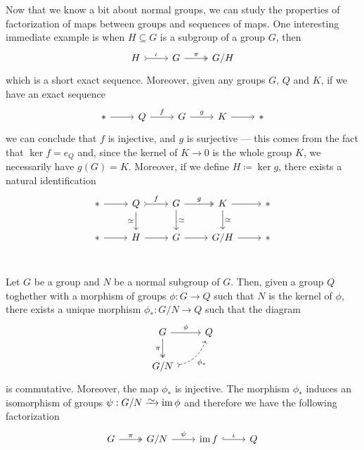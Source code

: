 Now that we know a bit about normal groups, we can study the properties of
factorization of maps between groups and sequences of maps. One interesting
immediate example is when \(H \subseteq G\) is a subgroup of a group \(G\), then
\[
  \begin{tikzcd}
    H \ar[r, tail, "\iota"] &G \ar[r, two heads, "\pi"] &G/H
  \end{tikzcd}
\]
which is a short exact sequence. Moreover, given any groups \(G\), \(Q\) and
\(K\), if we have an exact sequence
\[
  \begin{tikzcd}
    * \ar[r] &Q \ar[r, "f"] &G \ar[r, "g"] &K \ar[r] &*
  \end{tikzcd}
\]
we can conclude that \(f\) is injective, and \(g\) is surjective --- this comes
from the fact that \(\ker f = e_Q\) and, since the kernel of \(K \to 0\) is the
whole group \(K\), we necessarily have \(g(G) = K\). Moreover, if we define \(H
\coloneq \ker g\), there exists a natural identification
\[
  \begin{tikzcd}
    * \ar[r]
    &Q \ar[d, swap, "\iso"] \ar[r, tail, "f"]
    &G \ar[r, two heads, "g"] \ar[d, "\iso"]
    &K \ar[r] \ar[d, "\iso"]
    &* \\
    * \ar[r] &H \ar[r] &G \ar[r] &G/H \ar[r] &* \\
  \end{tikzcd}
\]

\begin{proposition}
\label{prop:universal-property-quotients-grp}
Let \(G\) be a group and \(N\) be a normal subgroup of \(G\). Then, given a
group \(Q\) toghether with a morphism of groups \(\phi: G \to Q\) such that
\(N\) is the kernel of \(\phi\), there exists a unique morphism
\(\phi_{*}: G/N \to Q\) such that the diagram
\[
  \begin{tikzcd}
    G \ar[d, two heads, swap, "\pi"] \ar[r, "\phi"] &Q \\
    G/N \ar[ur, dashed, swap, bend right, tail, "\phi_{*}"] &
  \end{tikzcd}
\]
is commutative. Moreover, the map \(\phi_*\) is injective. The morphism
\(\phi_{*}\) induces an isomorphism of groups \(\psi: G/N \isoto \im \phi\) and
therefore we have the following factorization
\[
  \begin{tikzcd}
    G \ar[r, two heads, "\pi"] &G/N \ar[r, "\psi"]
    &\im f \ar[r, hook, "\iota"] &Q
  \end{tikzcd}
\]
\end{proposition}

